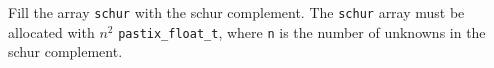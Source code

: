          {Fill the array \texttt{schur} with the schur complement.
         The \texttt{schur} array must be allocated with $n^2$ \texttt{pastix\_float\_t}, where
         \texttt{n} is the number of unknowns in the schur complement.}
